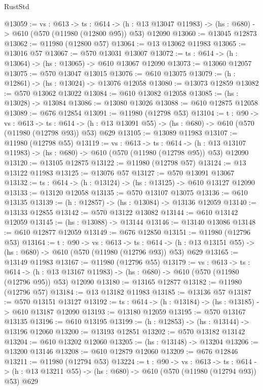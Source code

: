 \begin{lexlean}{RustStd}
\begin{coremodule}
@13059 := {vs : @613} ->
  {ts : @614} ->
  (h : @13 @13047 @11983) -> (hs : @680) -> @610 (@570 (@11980 (@12800 @95)) @53) @12090
@13060 := @13045 @12873
@13062 := @11980 (@12800 @57)
@13064 := @13 @13062 @11983
@13065 := @13016 @57
@13067 := @570 @13031 @13007
@13072 := {ts : @614} -> (h : @13064) -> (hs : @13065) -> @610 @13067 @12090
@13073 := @13060 @12057
@13075 := @570 @13047 @13015
@13076 := @610 @13075
@13079 := (h : @12861) -> (hs : @13024) -> @13076 @12058
@13080 := @13073 @12859
@13082 := @570 @13062 @13022
@13084 := @610 @13082 @12058
@13085 := (hs : @13028) -> @13084
@13086 := @13080 @13026
@13088 := @610 @12875 @12058
@13089 := @676 @12854
@13091 := @11980 (@12798 @53)
@13104 := {t : @90} ->
  {vs : @613} ->
  {ts : @614} -> (h : @13 @13091 @55) -> (hs : @680) -> @610 (@570 (@11980 (@12798 @93)) @53) @629
@13105 := @13089 @11983
@13107 := @11980 (@12798 @55)
@13119 := {vs : @613} ->
  {ts : @614} ->
  (h : @13 @13107 @11983) -> (hs : @680) -> @610 (@570 (@11980 (@12798 @95)) @53) @12090
@13120 := @13105 @12875
@13122 := @11980 (@12798 @57)
@13124 := @13 @13122 @11983
@13125 := @13076 @57
@13127 := @570 @13091 @13067
@13132 := {ts : @614} -> (h : @13124) -> (hs : @13125) -> @610 @13127 @12090
@13133 := @13120 @12058
@13135 := @570 @13107 @13075
@13136 := @610 @13135
@13139 := (h : @12857) -> (hs : @13084) -> @13136 @12059
@13140 := @13133 @12855
@13142 := @570 @13122 @13082
@13144 := @610 @13142 @12059
@13145 := (hs : @13088) -> @13144
@13146 := @13140 @13086
@13148 := @610 @12877 @12059
@13149 := @676 @12850
@13151 := @11980 (@12796 @53)
@13164 := {t : @90} ->
  {vs : @613} ->
  {ts : @614} -> (h : @13 @13151 @55) -> (hs : @680) -> @610 (@570 (@11980 (@12796 @93)) @53) @629
@13165 := @13149 @11983
@13167 := @11980 (@12796 @55)
@13179 := {vs : @613} ->
  {ts : @614} ->
  (h : @13 @13167 @11983) -> (hs : @680) -> @610 (@570 (@11980 (@12796 @95)) @53) @12090
@13180 := @13165 @12877
@13182 := @11980 (@12796 @57)
@13184 := @13 @13182 @11983
@13185 := @13136 @57
@13187 := @570 @13151 @13127
@13192 := {ts : @614} -> (h : @13184) -> (hs : @13185) -> @610 @13187 @12090
@13193 := @13180 @12059
@13195 := @570 @13167 @13135
@13196 := @610 @13195
@13199 := (h : @12853) -> (hs : @13144) -> @13196 @12060
@13200 := @13193 @12851
@13202 := @570 @13182 @13142
@13204 := @610 @13202 @12060
@13205 := (hs : @13148) -> @13204
@13206 := @13200 @13146
@13208 := @610 @12879 @12060
@13209 := @676 @12846
@13211 := @11980 (@12794 @53)
@13224 := {t : @90} ->
  {vs : @613} ->
  {ts : @614} -> (h : @13 @13211 @55) -> (hs : @680) -> @610 (@570 (@11980 (@12794 @93)) @53) @629

\end{coremodule}
\end{lexlean}
